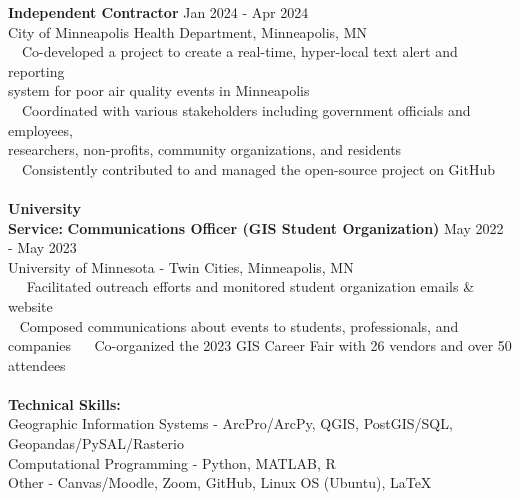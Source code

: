 \documentclass[letterpaper,12pt]{article}
\numberwithin{equation}{section}
\begin{document}
\hspace*{1.16in}\textbf{Independent Contractor} \hspace*{2.8in} Jan 2024 - Apr 2024\\
\hspace*{1.2in} City of Minneapolis Health Department, Minneapolis, MN \vspace*{.1cm} \\
\hspace*{1.2in} \textbullet ~~Co-developed a project to create a real-time, hyper-local text alert and reporting\\
\hspace*{1.6in} system for poor air quality events in Minneapolis
\\
\hspace*{1.2in} \textbullet ~~Coordinated with various stakeholders including government officials and employees, \\
\hspace*{1.6in} researchers, non-profits, community organizations, and residents \\
\hspace*{1.2in} \textbullet ~~Consistently contributed to and managed the open-source project on GitHub
\\\\
\noindent\textbf{University}\\
\noindent\textbf{Service:} \hspace*{.45in}\textbf{Communications Officer (GIS Student Organization)} \hspace*{.43in} May 2022 - May 2023\\
\hspace*{1.16in} University of Minnesota - Twin Cities, Minneapolis, MN \vspace*{.1cm}\\
\hspace*{1.2in} \textbullet ~~ Facilitated outreach efforts and monitored student organization emails \& website\\
\hspace*{1.2in} \textbullet ~ Composed communications about events to students, professionals, and companies
\hspace*{1.2in} \textbullet ~~ Co-organized the 2023 GIS Career Fair with 26 vendors and over 50 attendees
\\\\
\noindent\textbf{Technical Skills:}
\vspace*{.3cm} \\ Geographic Information Systems - ArcPro/ArcPy, QGIS, PostGIS/SQL, Geopandas/PySAL/Rasterio
\vspace*{.3cm} \\ Computational Programming - Python, MATLAB, R
\vspace*{.3cm} \\ Other - Canvas/Moodle, Zoom, GitHub, Linux OS (Ubuntu), \LaTeX
\end{document}
